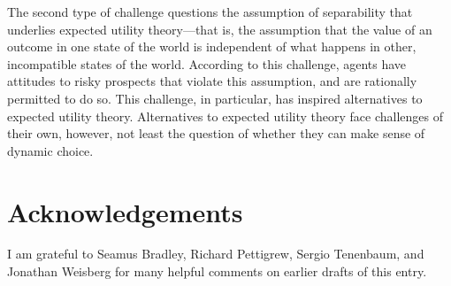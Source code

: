 The second type of challenge questions the assumption of separability that underlies expected utility theory---that is, the assumption that the value of an outcome in one state of the world is independent of what happens in other, incompatible states of the world. According to this challenge, agents have attitudes to risky prospects that violate this assumption, and are rationally permitted to do so. This challenge, in particular, has inspired alternatives to expected utility theory. Alternatives to expected utility theory face challenges of their own, however, not least the question of whether they can make sense of dynamic choice.

\section*{Acknowledgements}

I am grateful to Seamus Bradley, Richard Pettigrew, Sergio Tenenbaum, and Jonathan Weisberg for many helpful comments on earlier drafts of this entry.